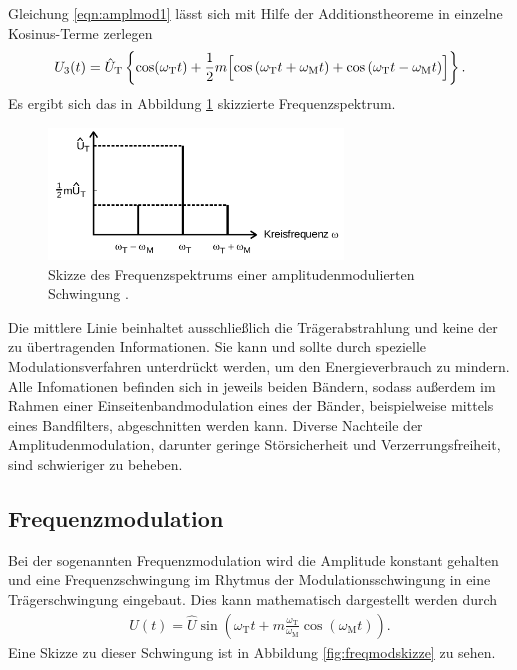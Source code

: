 Gleichung \eqref{eqn:amplmod1} lässt sich mit Hilfe der Additionstheoreme in einzelne
Kosinus-Terme zerlegen
\begin{align}
  U_3(t) = \hat{U}_\text{T} \left\{ \cos(\omega_\text{T} t) + \frac12 m \Bigl[ \cos{(\omega_\text{T} t +\omega_\text{M} t)} + \cos{(\omega_\text{T}t-\omega_\text{M}t)} \Bigr] \right\}.
\end{align}
Es ergibt sich das in Abbildung \ref{fig:freqspektrum} skizzierte Frequenzspektrum.

\begin{figure}
  \centering
  \includegraphics[height=3.5cm]{JasperErsterSchultag/freqspektrum.png}
  \caption{Skizze des Frequenzspektrums einer amplitudenmodulierten Schwingung \cite{anleitung}.}
  \label{fig:freqspektrum}
\end{figure}

Die mittlere Linie beinhaltet ausschließlich die Trägerabstrahlung und keine der zu übertragenden
Informationen. Sie kann und sollte durch spezielle Modulationsverfahren unterdrückt werden, um den Energieverbrauch
zu mindern. Alle Infomationen befinden sich in jeweils beiden Bändern, sodass außerdem im Rahmen einer
Einseitenbandmodulation eines der Bänder, beispielweise mittels eines Bandfilters, abgeschnitten werden kann.
Diverse Nachteile der Amplitudenmodulation, darunter geringe Störsicherheit und Verzerrungsfreiheit, sind
schwieriger zu beheben.

\subsection{Frequenzmodulation}

Bei der sogenannten Frequenzmodulation wird die Amplitude konstant gehalten und eine Frequenzschwingung im Rhytmus
der Modulationsschwingung in eine Trägerschwingung eingebaut. Dies kann mathematisch dargestellt werden durch
\begin{align}
  U(t) = \hat{U} \sin \left( \omega_\text{T} t + m \frac{\omega_\text{T}}{\omega_\text{M}} \cos(\omega_\text{M} t) \right).
\end{align}
Eine Skizze zu dieser Schwingung ist in Abbildung \ref{fig:freqmodskizze} zu sehen.

